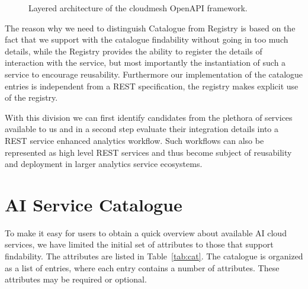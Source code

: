 \documentclass[fullpage,12pt]{article}
\begin{document}
\begin{figure}[htb]
\begin{center}
\end{center}
\vspace{-12pt}
\caption{Layered architecture of the cloudmesh Open\-API framework.}
\label{fig:1}
\end{figure}

The reason why we need to distinguish Catalogue from Registry is based on the fact that we support with the catalogue findability without going in too much details, while the Registry provides the ability to register the details of interaction with the service, but most importantly the instantiation of such a service to encourage reusability. Furthermore our implementation of the catalogue entries is independent from a REST specification, the registry makes explicit use of the registry. 

With this division we can first identify candidates from the plethora of services available to us and in a second step evaluate their integration details into a REST service enhanced analytics workflow. Such workflows can also be represented as high level REST services and thus become subject of reusability and deployment in larger analytics service ecosystems. 


\section{AI Service Catalogue}

To make it easy for users to obtain a quick overview about available AI cloud services, we have limited the initial set of attributes to those that support findability. The attributes are listed in Table~\ref{tab:cat}. The catalogue is organized as a list of entries, where each entry contains a number of attributes. These attributes may be required or optional. 
\end{document}
